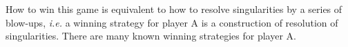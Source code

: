 \documentclass[12pt]{article}
\theoremstyle{definition}
\theoremstyle{plain}
\begin{document}
How to win this game is equivalent to how to resolve singularities
by a series of blow-ups, \textit{i.e.}
a winning strategy for player A is a construction of resolution of singularities. 
There are many known winning strategies for player A. 
\cite{spivakovsky1983solution,zeillinger2006short,hauser2003hironaka}

% 
% 
% 
\end{document}
